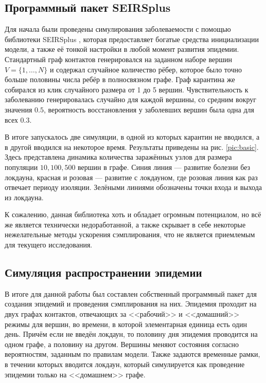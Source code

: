 	\subsection*{Программный пакет SEIRSplus}
	
	Для начала были проведены симулирования заболеваемости с помощью библиотеки SEIRSplus \cite{seirsplus}, которая предоставляет богатые средства инициализации модели, а также её тонкой настройки в любой момент развития эпидемии. Стандартный граф контактов генерировался на заданном наборе вершин $ V = \{1, \ldots, N\} $ и содержал случайное количество рёбер, которое было точно больше половины числа ребёр в полносвязном графе. Граф карантина же собирался из клик случайного размера от 1 до 5 вершин. Чувствительность к заболеванию генерировалась случайно для каждой вершины, со средним вокруг значения $ 0.5 $, вероятность восстановления у заболевших вершин была одна для всех $ 0.3 $. 
	
	В итоге запускалось две симуляции, в одной из которых карантин не вводился, а в другой вводился на некоторое время. Результаты приведены на рис. \ref{pic:basic}. Здесь представлена динамика количества заражённых узлов для размера популяции $ 10, 100, 500 $ вершин в графе. Синия линия --- развитие болезни без локдауна, красная и розовая --- развитие с локдауном, где розовая линия как раз отвечает периоду изоляции. Зелёными линиями обозначены точки входа и выхода из локдауна.
	
	К сожалению, данная библиотека хоть и обладает огромным потенциалом, но всё же является технически недоработанной, а также скрывает в себе некоторые нежелательные методы ускорения сэмплирования, что не является приемлемым для текущего исследования. 

	\subsection*{Симуляция распространении эпидемии}
	
	В итоге для данной работы был составлен собственный программный пакет для создания эпидемий и проведения сэмплирования на них. Эпидемия проходит на двух графах контактов, отвечающих за <<рабочий>> и <<домашний>> режимы для вершин, во времени, в которой элементарная единица есть один день. Причём если не введён локдаун, то половину дня эпидемия проводится на одном графе, а половину на другом. Вершины меняют состояния согласно вероятностям, заданным по правилам модели. Также задаются временные рамки, в течении которых вводится локдаун, который симулируется как проведение эпидемии только на <<домашнем>> графе.
	
